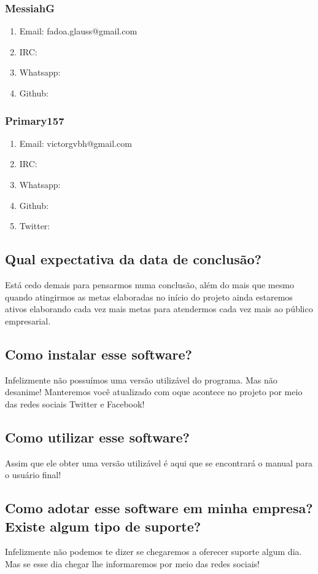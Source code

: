 \documentclass[a4paper,12pt]{article}
\begin{document}
			\subsubsection{MessiahG}
			\begin{enumerate}
				\item Email: fadoa.glauss@gmail.com
				\item IRC:
				\item Whatsapp:
				\item Github:
			\end{enumerate}
			\subsubsection{Primary157}
			\begin{enumerate}
				\item Email: victorgvbh@gmail.com
				\item IRC:
				\item Whatsapp:
				\item Github:
				\item Twitter:
			\end{enumerate}
		\subsection{Qual expectativa da data de conclusão?}
			Está cedo demais para pensarmos numa conclusão, além do mais que mesmo quando atingirmos as metas elaboradas no início do projeto ainda estaremos ativos elaborando cada vez mais metas para atendermos cada vez mais ao público empresarial.
		\subsection{Como instalar esse software?}
			Infelizmente não possuímos uma versão utilizável do programa. Mas não desanime! Manteremos você atualizado com oque acontece no projeto por meio das redes sociais Twitter e Facebook!
		\subsection{Como utilizar esse software?}
			Assim que ele obter uma versão utilizável é aqui que se encontrará o manual para o usuário final!
		\subsection{Como adotar esse software em minha empresa? Existe algum tipo de suporte?}
			Infelizmente não podemos te dizer se chegaremos a oferecer suporte algum dia. Mas se esse dia chegar lhe informaremos por meio das redes sociais!
\end{document}
